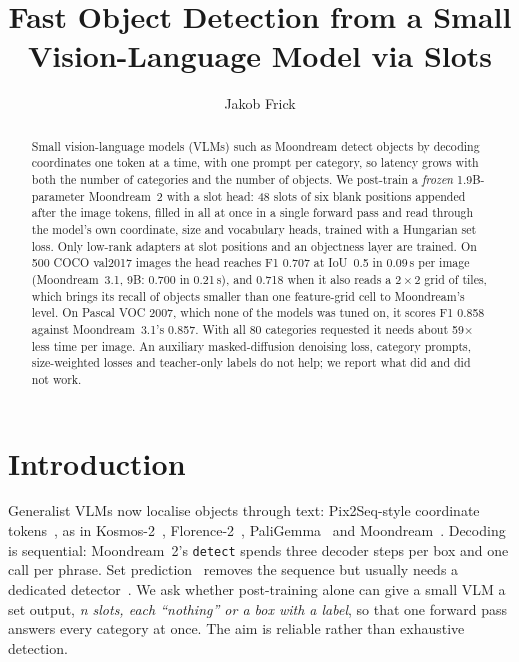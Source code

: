 \documentclass[10pt,twocolumn]{article}
\title{\vspace{-2.2em}\Large\bfseries Fast Object Detection from a Small Vision-Language Model via Slots}
\author{Jakob Frick}
\date{\vspace{-2.4em}}
\begin{document}
\maketitle

\begin{abstract}
\noindent Small vision-language models (VLMs) such as Moondream detect objects by
decoding coordinates one token at a time, with one prompt per category, so latency
grows with both the number of categories and the number of objects. We post-train a
\emph{frozen} 1.9B-parameter Moondream~2 with a slot head: 48 slots of six blank
positions appended after the image tokens, filled in all at once in a single forward pass
and read through the model's own coordinate, size and vocabulary heads, trained with a
Hungarian set loss. Only low-rank adapters at slot positions and an objectness layer are
trained. On 500 COCO val2017 images the head reaches F1 0.707 at IoU~0.5 in 0.09\,s per
image (Moondream~3.1, 9B: 0.700 in 0.21\,s), and 0.718 when it also reads a $2\times2$
grid of tiles, which brings its recall of objects smaller than one feature-grid cell to
Moondream's level. On Pascal VOC 2007, which none of the models was tuned on, it scores
F1 0.858 against Moondream~3.1's 0.857. With all 80 categories requested it needs about
59$\times$ less time per image. An auxiliary masked-diffusion denoising loss, category
prompts, size-weighted losses and teacher-only labels do not help; we report what did
and did not work.
\end{abstract}

\section{Introduction}
Generalist VLMs now localise objects through text: Pix2Seq-style coordinate
tokens~\citep{chen2022pix2seq}, as in Kosmos-2~\citep{peng2023kosmos2},
Florence-2~\citep{xiao2024florence2}, PaliGemma~\citep{beyer2024paligemma} and
Moondream~\citep{moondream,moondream31}. Decoding is sequential: Moondream~2's
\texttt{detect} spends three decoder steps per box and one call per phrase. Set
prediction~\citep{carion2020detr} removes the sequence but usually needs a dedicated
detector~\citep{liu2024groundingdino,minderer2022owlvit}. We ask whether
post-training alone can give a small VLM a set output, \emph{n slots, each ``nothing'' or a
box with a label}, so that one forward pass answers every category at once. The aim is
reliable rather than exhaustive detection.
\end{document}
